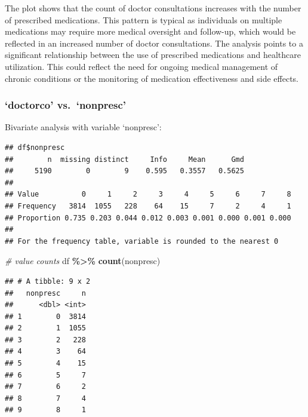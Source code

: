 \documentclass[
]{article}
\newenvironment{Shaded}{\begin{snugshade}}{\end{snugshade}}
\newcommand{\CommentTok}[1]{\textcolor[rgb]{0.56,0.35,0.01}{\textit{#1}}}
\newcommand{\FunctionTok}[1]{\textcolor[rgb]{0.13,0.29,0.53}{\textbf{#1}}}
\newcommand{\NormalTok}[1]{#1}
\newcommand{\SpecialCharTok}[1]{\textcolor[rgb]{0.81,0.36,0.00}{\textbf{#1}}}
\begin{document}
The plot shows that the count of doctor consultations increases with the
number of prescribed medications. This pattern is typical as individuals
on multiple medications may require more medical oversight and
follow-up, which would be reflected in an increased number of doctor
consultations. The analysis points to a significant relationship between
the use of prescribed medications and healthcare utilization. This could
reflect the need for ongoing medical management of chronic conditions or
the monitoring of medication effectiveness and side effects.

\subsubsection{`doctorco' vs.~`nonpresc'}\label{doctorco-vs.-nonpresc}

Bivariate analysis with variable `nonpresc':

\begin{Shaded}
\end{Shaded}

\begin{verbatim}
## df$nonpresc 
##        n  missing distinct     Info     Mean      Gmd 
##     5190        0        9    0.595   0.3557   0.5625 
##                                                                 
## Value          0     1     2     3     4     5     6     7     8
## Frequency   3814  1055   228    64    15     7     2     4     1
## Proportion 0.735 0.203 0.044 0.012 0.003 0.001 0.000 0.001 0.000
## 
## For the frequency table, variable is rounded to the nearest 0
\end{verbatim}

\begin{Shaded}
\begin{Highlighting}[]
\CommentTok{\# value counts}
\NormalTok{df }\SpecialCharTok{\%\textgreater{}\%} \FunctionTok{count}\NormalTok{(nonpresc)}
\end{Highlighting}
\end{Shaded}

\begin{verbatim}
## # A tibble: 9 x 2
##   nonpresc     n
##      <dbl> <int>
## 1        0  3814
## 2        1  1055
## 3        2   228
## 4        3    64
## 5        4    15
## 6        5     7
## 7        6     2
## 8        7     4
## 9        8     1
\end{verbatim}
\end{document}
